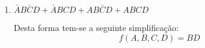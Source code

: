 \documentclass{article}
\begin{document}
\begin{resolution}
\begin{enumerate}[label=(\alph*), rightmargin = \leftmargin]
                    \item $\bar{A}B\bar{C}D + \bar{A}BCD + AB\bar{C}D + ABCD$
                        \begin{figure}[H]
                            \centering
                            \begin{karnaugh-map}[4][4][1][$A\;B$][$C\;D$]
                            \end{karnaugh-map}
                        \end{figure}\noindent
                    Desta forma tem-se a seguinte simplificação:
                        \begin{equation}
                            \boxed{
                                f(A,B,C,D) = BD
                            }
                        \end{equation}


\end{enumerate}
\end{resolution}
\end{document}
